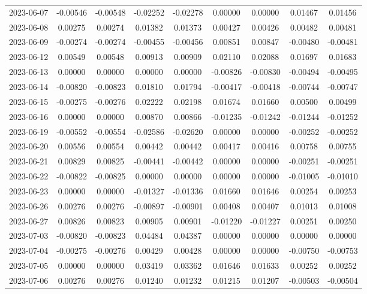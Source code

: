 \begin{footnotesize}
\begin{longtable}{lcccccccc}
2023-06-07 & -0.00546 & -0.00548 & -0.02252 & -0.02278 & 0.00000 & 0.00000 & 0.01467 & 0.01456 \\
2023-06-08 & 0.00275 & 0.00274 & 0.01382 & 0.01373 & 0.00427 & 0.00426 & 0.00482 & 0.00481 \\
2023-06-09 & -0.00274 & -0.00274 & -0.00455 & -0.00456 & 0.00851 & 0.00847 & -0.00480 & -0.00481 \\
2023-06-12 & 0.00549 & 0.00548 & 0.00913 & 0.00909 & 0.02110 & 0.02088 & 0.01697 & 0.01683 \\
2023-06-13 & 0.00000 & 0.00000 & 0.00000 & 0.00000 & -0.00826 & -0.00830 & -0.00494 & -0.00495 \\
2023-06-14 & -0.00820 & -0.00823 & 0.01810 & 0.01794 & -0.00417 & -0.00418 & -0.00744 & -0.00747 \\
2023-06-15 & -0.00275 & -0.00276 & 0.02222 & 0.02198 & 0.01674 & 0.01660 & 0.00500 & 0.00499 \\
2023-06-16 & 0.00000 & 0.00000 & 0.00870 & 0.00866 & -0.01235 & -0.01242 & -0.01244 & -0.01252 \\
2023-06-19 & -0.00552 & -0.00554 & -0.02586 & -0.02620 & 0.00000 & 0.00000 & -0.00252 & -0.00252 \\
2023-06-20 & 0.00556 & 0.00554 & 0.00442 & 0.00442 & 0.00417 & 0.00416 & 0.00758 & 0.00755 \\
2023-06-21 & 0.00829 & 0.00825 & -0.00441 & -0.00442 & 0.00000 & 0.00000 & -0.00251 & -0.00251 \\
2023-06-22 & -0.00822 & -0.00825 & 0.00000 & 0.00000 & 0.00000 & 0.00000 & -0.01005 & -0.01010 \\
2023-06-23 & 0.00000 & 0.00000 & -0.01327 & -0.01336 & 0.01660 & 0.01646 & 0.00254 & 0.00253 \\
2023-06-26 & 0.00276 & 0.00276 & -0.00897 & -0.00901 & 0.00408 & 0.00407 & 0.01013 & 0.01008 \\
2023-06-27 & 0.00826 & 0.00823 & 0.00905 & 0.00901 & -0.01220 & -0.01227 & 0.00251 & 0.00250 \\
2023-07-03 & -0.00820 & -0.00823 & 0.04484 & 0.04387 & 0.00000 & 0.00000 & 0.00000 & 0.00000 \\
2023-07-04 & -0.00275 & -0.00276 & 0.00429 & 0.00428 & 0.00000 & 0.00000 & -0.00750 & -0.00753 \\
2023-07-05 & 0.00000 & 0.00000 & 0.03419 & 0.03362 & 0.01646 & 0.01633 & 0.00252 & 0.00252 \\
2023-07-06 & 0.00276 & 0.00276 & 0.01240 & 0.01232 & 0.01215 & 0.01207 & -0.00503 & -0.00504 \\

\end{longtable}
\end{footnotesize}
